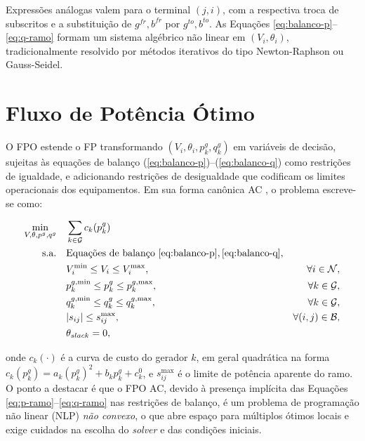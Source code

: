 Expressões análogas valem para o terminal $(j,i)$, com a respectiva troca de subscritos e a substituição de $g^{fr}, b^{fr}$ por $g^{to}, b^{to}$. As Equações \ref{eq:balanco-p}--\ref{eq:q-ramo} formam um sistema algébrico não linear em $(V_i, \theta_i)$, tradicionalmente resolvido por métodos iterativos do tipo Newton-Raphson ou Gauss-Seidel.

\section{Fluxo de Potência Ótimo}
\label{sec:fpo-ac}

O FPO estende o FP transformando $(V_i, \theta_i, p^g_k, q^g_k)$ em variáveis de decisão, sujeitas às equações de balanço (\ref{eq:balanco-p})--(\ref{eq:balanco-q}) como restrições de igualdade, e adicionando restrições de desigualdade que codificam os limites operacionais dos equipamentos. Em sua forma canônica AC \cite{molzahn2019survey}, o problema escreve-se como:

\begin{equation}
\label{eq:fpo}
\begin{aligned}
\min_{V,\theta,p^g,q^g} \quad & \sum_{k \in \mathcal{G}} c_k(p^g_k) \\
\text{s.a.} \quad & \text{Equações de balanço } \eqref{eq:balanco-p}, \eqref{eq:balanco-q}, \\
& V^{\min}_i \le V_i \le V^{\max}_i, & \forall i \in \mathcal{N}, \\
& p^{g,\min}_k \le p^g_k \le p^{g,\max}_k, & \forall k \in \mathcal{G}, \\
& q^{g,\min}_k \le q^g_k \le q^{g,\max}_k, & \forall k \in \mathcal{G}, \\
& |s_{ij}| \le s^{\max}_{ij}, & \forall (i,j) \in \mathcal{B}, \\
& \theta_{slack} = 0,
\end{aligned}
\end{equation}

\noindent onde $c_k(\cdot)$ é a curva de custo do gerador $k$, em geral quadrática na forma $c_k(p^g_k) = a_k (p^g_k)^2 + b_k p^g_k + c_k^0$, e $s^{\max}_{ij}$ é o limite de potência aparente do ramo. O ponto a destacar é que o FPO AC, devido à presença implícita das Equações \eqref{eq:p-ramo}--\eqref{eq:q-ramo} nas restrições de balanço, é um problema de programação não linear (NLP) \emph{não convexo}, o que abre espaço para múltiplos ótimos locais e exige cuidados na escolha do \textit{solver} e das condições iniciais.

